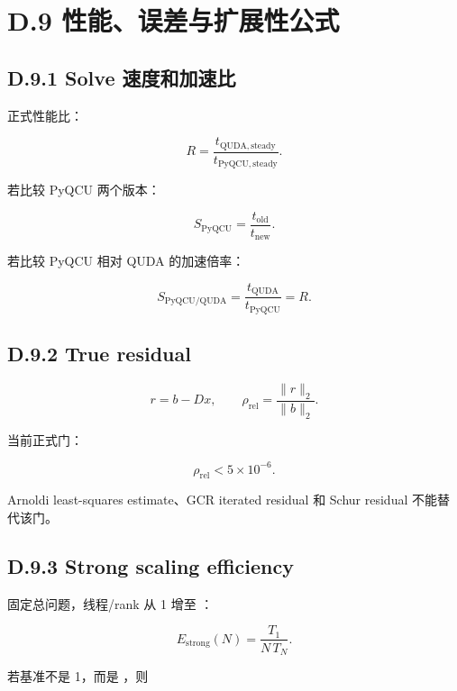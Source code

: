 \documentclass[UTF8,a4paper,10pt]{ctexart}
\DeclareRobustCommand{\pycode}[1]{\texorpdfstring{\texttt{\seqsplit{#1}}}{#1}}
\begin{document}
\section{D.9 性能、误差与扩展性公式}
\subsection{D.9.1 Solve 速度和加速比}
正式性能比：

\begin{displaymath}
R=\frac{t_{\mathrm{QUDA,steady}}}{t_{\mathrm{PyQCU,steady}}}.
\end{displaymath}

若比较 PyQCU 两个版本：

\begin{displaymath}
S_{\mathrm{PyQCU}}=\frac{t_{\mathrm{old}}}{t_{\mathrm{new}}}.
\end{displaymath}

若比较 PyQCU 相对 QUDA 的加速倍率：

\begin{displaymath}
S_{\mathrm{PyQCU/QUDA}} =\frac{t_{\mathrm{QUDA}}}{t_{\mathrm{PyQCU}}} =R.
\end{displaymath}

\subsection{D.9.2 True residual}
\begin{displaymath}
r=b-Dx, \qquad \rho_{\mathrm{rel}}= \frac{\| r\|_2}{\| b\|_2}.
\end{displaymath}

当前正式门：

\begin{displaymath}
\rho_{\mathrm{rel}}<5\times10^{-6}.
\end{displaymath}

Arnoldi least-squares estimate、GCR iterated residual 和 Schur residual 不能替代该门。

\subsection{D.9.3 Strong scaling efficiency}
固定总问题，线程/rank 从 1 增至 \pycode{N}：

\begin{displaymath}
E_{\mathrm{strong}}(N) =\frac{T_1}{N\,T_N}.
\end{displaymath}

若基准不是 1，而是 \pycode{N0}，则
\end{document}

